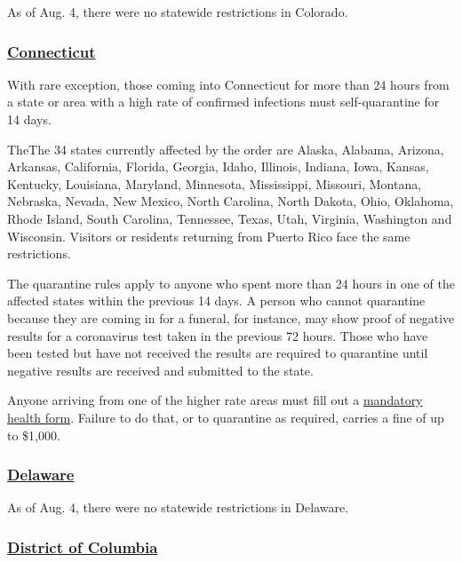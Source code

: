 As of Aug. 4, there were no statewide restrictions in Colorado.

\hypertarget{connecticut}{%
\subsubsection{\texorpdfstring{\href{https://portal.ct.gov/Coronavirus/Covid-19-Knowledge-Base/Travel-In-or-Out-of-CT}{Connecticut}}{Connecticut}}\label{connecticut}}

With rare exception, those coming into Connecticut for more than 24
hours from a state or area with a high rate of confirmed infections must
self-quarantine for 14 days.

TheThe 34 states currently affected by the order are Alaska, Alabama,
Arizona, Arkansas, California, Florida, Georgia, Idaho, Illinois,
Indiana, Iowa, Kansas, Kentucky, Louisiana, Maryland, Minnesota,
Mississippi, Missouri, Montana, Nebraska, Nevada, New Mexico, North
Carolina, North Dakota, Ohio, Oklahoma, Rhode Island, South Carolina,
Tennessee, Texas, Utah, Virginia, Washington and Wisconsin. Visitors or
residents returning from Puerto Rico face the same restrictions.

The quarantine rules apply to anyone who spent more than 24 hours in one
of the affected states within the previous 14 days. A person who cannot
quarantine because they are coming in for a funeral, for instance, may
show proof of negative results for a coronavirus test taken in the
previous 72 hours. Those who have been tested but have not received the
results are required to quarantine until negative results are received
and submitted to the state.

Anyone arriving from one of the higher rate areas must fill out a
\href{https://appengine.egov.com/apps/ct/DPH/Connecticut-Travel-Health-Form}{mandatory
health form}. Failure to do that, or to quarantine as required, carries
a fine of up to \$1,000.

\hypertarget{delaware}{%
\subsubsection{\texorpdfstring{\href{https://www.visitdelaware.com/industry/covid-19-in-delaware/}{Delaware}}{Delaware}}\label{delaware}}

As of Aug. 4, there were no statewide restrictions in Delaware.

\hypertarget{district-of-columbia}{%
\subsubsection{\texorpdfstring{\href{https://washington.org/dc-information/coronavirus-travel-update-washington-dc}{District
of Columbia}}{District of Columbia}}\label{district-of-columbia}}

